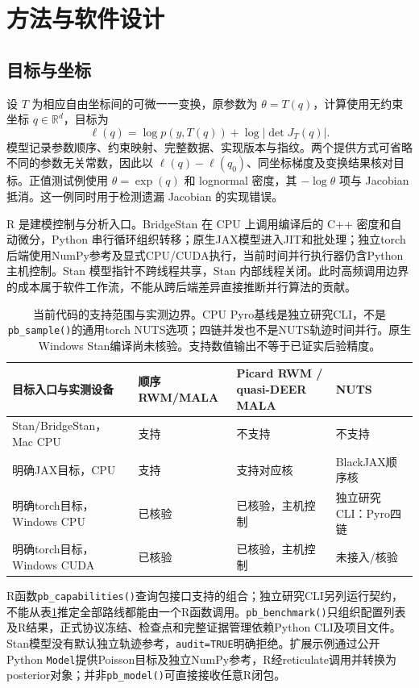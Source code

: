 \documentclass[UTF8,fontset=fandol,zihao=-4]{ctexart}
\newcommand{\R}{\mathbb{R}}
\begin{document}
\section{方法与软件设计}
\subsection{目标与坐标}
设 $T$ 为相应自由坐标间的可微一一变换，原参数为 $\theta=T(q)$，计算使用无约束坐标 $q\in\R^d$，目标为
\begin{equation}
 \ell(q)=\log p(y,T(q))+\log|\det J_T(q)|.
\end{equation}
模型记录参数顺序、约束映射、完整数据、实现版本与指纹。两个提供方式可省略不同的参数无关常数，因此以 $\ell(q)-\ell(q_0)$、同坐标梯度及变换结果核对目标。正值测试例使用 $\theta=\exp(q)$ 和 lognormal 密度，其 $-\log\theta$ 项与 Jacobian 抵消。这一例同时用于检测遗漏 Jacobian 的实现错误。

R 是建模控制与分析入口。BridgeStan 在 CPU 上调用编译后的 C++ 密度和自动微分，Python 串行循环组织转移；原生JAX模型进入JIT和批处理；独立torch后端使用NumPy参考及显式CPU/CUDA执行，当前时间并行执行器仍含Python主机控制。Stan 模型指针不跨线程共享，Stan 内部线程关闭。此时高频调用边界的成本属于软件工作流，不能从跨后端差异直接推断并行算法的贡献。

\begin{table}[htbp]\centering\small
\begin{tabular}{>{\raggedright\arraybackslash}p{.27\linewidth}>{\raggedright\arraybackslash}p{.16\linewidth}>{\raggedright\arraybackslash}p{.24\linewidth}>{\raggedright\arraybackslash}p{.22\linewidth}}\toprule
目标入口与实测设备 & 顺序RWM/MALA & Picard RWM / quasi-DEER MALA & NUTS\\\midrule
Stan/BridgeStan，Mac CPU & 支持 & 不支持 & 不支持\\
明确JAX目标，CPU & 支持 & 支持对应核 & BlackJAX顺序核\\
明确torch目标，Windows CPU & 已核验 & 已核验，主机控制 & 独立研究CLI：Pyro四链\\
明确torch目标，Windows CUDA & 已核验 & 已核验，主机控制 & 未接入/核验\\\bottomrule
\end{tabular}
\caption{当前代码的支持范围与实测边界。CPU Pyro基线是独立研究CLI，不是\texttt{pb\_sample()}的通用torch NUTS选项；四链并发也不是NUTS轨迹时间并行。原生Windows Stan编译尚未核验。支持数值输出不等于已证实后验精度。}
\label{tab:capabilities}
\end{table}

R函数\texttt{pb\_capabilities()}查询包接口支持的组合；独立研究CLI另列运行契约，不能从表\ref{tab:capabilities}推定全部路线都能由一个R函数调用。\texttt{pb\_benchmark()}只组织配置列表及R结果，正式协议冻结、检查点和完整证据管理依赖Python CLI及项目文件。Stan模型没有默认独立轨迹参考，\texttt{audit=TRUE}明确拒绝。扩展示例通过公开Python \texttt{Model}提供Poisson目标及独立NumPy参考，R经reticulate调用并转换为posterior对象；并非\texttt{pb\_model()}可直接接收任意R闭包。
\end{document}
